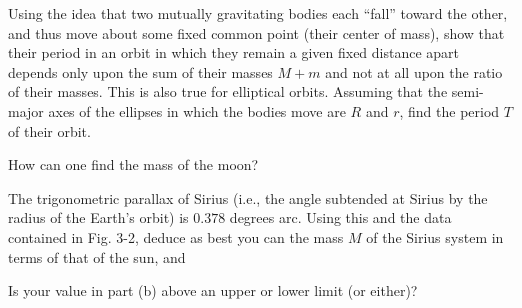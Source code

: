 \documentclass[../feynman-lectures-on-physics.tex]{subfiles}
\begin{document}
\begin{questions}

	\question Using the idea that two mutually gravitating bodies each ``fall'' toward the other, and thus move about some fixed common point (their center of mass), show that their period in an orbit in which they remain a given fixed distance apart depends only upon the sum of their masses $M + m$ and not at all upon the ratio of their masses. This is also true for elliptical orbits. Assuming that the semi-major axes of the ellipses in which the bodies move are $R$ and $r$, find the period $T$ of their orbit.

	\question How can one find the mass of the moon?

	\question The trigonometric parallax of Sirius (i.e., the angle subtended at Sirius by the radius of the Earth's orbit) is $0.378$ degrees arc. Using this and the data contained in Fig. 3-2, deduce as best you can the mass $M$ of the Sirius system in terms of that of the sun, and

	Is your value in part (b) above an upper or lower limit (or either)?

\end{questions}
\end{document}
